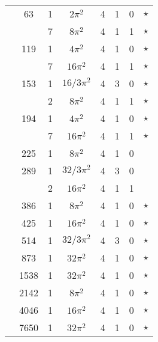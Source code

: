 \documentclass[12pt]{amsart}
\providecommand{\DIFadd}[1]{{\protect\color{blue}\uwave{#1}}} %
\providecommand{\DIFdel}[1]{{\protect\color{red}\sout{#1}}}                      %
\providecommand{\DIFaddbegin}{} %
\providecommand{\DIFaddend}{} %
\providecommand{\DIFdelbegin}{} %
\providecommand{\DIFdelend}{} %
\begin{document}
\begin{tabular}{ccc|ccccc}
 & 63 & 1 & $2\pi^2$ & 4 & 1 & 0 & $\star$ \\
 &  & 7 & $8\pi^2$ & 4 & 1 & 1 & $\star$ \\
 & 119 & 1 & $4\pi^2$ & 4 & 1 & 0 & $\star$ \\
 &  & 7 & $16\pi^2$ & 4 & 1 & 1 & $\star$ \\
 & 153 & 1 & \DIFdelbegin \DIFdel{$16/3\pi^2$ }\DIFdelend \DIFaddbegin \DIFadd{$(16/3)\pi^2$ }\DIFaddend & 4 & 3 & 0 & $\star$ \\
 &  & 2 & $8\pi^2$ & 4 & 1 & 1 & $\star$ \\
 & 194 & 1 & $4\pi^2$ & 4 & 1 & 0 & $\star$ \\
 &  & 7 & $16\pi^2$ & 4 & 1 & 1 & $\star$ \\
 & 225 & 1 & $8\pi^2$ & 4 & 1 & 0 &  \\
 & 289 & 1 & \DIFdelbegin \DIFdel{$32/3\pi^2$ }\DIFdelend \DIFaddbegin \DIFadd{$(32/3)\pi^2$ }\DIFaddend & 4 & 3 & 0 &  \\
 &  & 2 & $16\pi^2$ & 4 & 1 & 1 &  \\
 & 386 & 1 & $8\pi^2$ & 4 & 1 & 0 & $\star$ \\
 & 425 & 1 & $16\pi^2$ & 4 & 1 & 0 & $\star$ \\
 & 514 & 1 & \DIFdelbegin \DIFdel{$32/3\pi^2$ }\DIFdelend \DIFaddbegin \DIFadd{$(32/3)\pi^2$ }\DIFaddend & 4 & 3 & 0 & $\star$ \\
 & 873 & 1 & $32\pi^2$ & 4 & 1 & 0 & $\star$ \\
 & 1538 & 1 & $32\pi^2$ & 4 & 1 & 0 & $\star$ \\
 & 2142 & 1 & $8\pi^2$ & 4 & 1 & 0 & $\star$ \\
 & 4046 & 1 & $16\pi^2$ & 4 & 1 & 0 & $\star$ \\
 & 7650 & 1 & $32\pi^2$ & 4 & 1 & 0 & $\star$ \\
\end{tabular}
\end{document}
